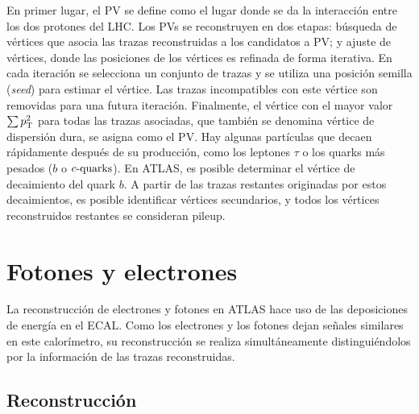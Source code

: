 En primer lugar, el \ac{PV} se define como el lugar donde se da la interacción entre los dos protones del \ac{LHC}. Los \acp{PV} se reconstruyen en dos etapas: búsqueda de vértices que asocia las trazas reconstruidas a los candidatos a \ac{PV}; y ajuste de vértices, donde las posiciones de los vértices es refinada de forma iterativa. En cada iteración se selecciona un conjunto de trazas y se utiliza una posición semilla (\textit{seed}) para estimar el vértice. Las trazas incompatibles con este vértice son removidas para una futura iteración.
Finalmente, el vértice con el mayor valor \(\sum p_{\text{T}}^2\) para todas las trazas asociadas, que también se denomina vértice de dispersión dura, se asigna como el \ac{PV}.
Hay algunas partículas que decaen rápidamente después de su producción, como los leptones \(\tau\) o los quarks más pesados (\(b\) o \(c\text{-quarks}\)). En \ac{ATLAS}, es posible determinar el vértice de decaimiento del quark \(b\). A partir de las trazas restantes originadas por estos decaimientos, es posible identificar vértices secundarios, y todos los vértices reconstruidos restantes se consideran pileup.








\section{Fotones y electrones}

La reconstrucción de electrones y fotones en \ac{ATLAS} hace uso de las deposiciones de energía en el \ac{ECAL}. Como los electrones y los fotones dejan señales similares en este calorímetro, su reconstrucción se realiza simultáneamente distinguiéndolos por la información de las trazas reconstruidas.


\subsection{Reconstrucción}
\label{subsec:objects:egamma:reco}

